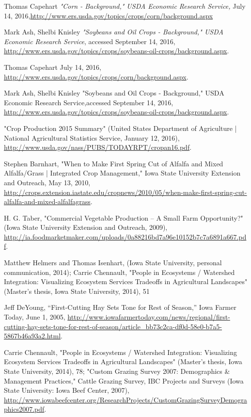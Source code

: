 \documentclass[11pt]{article}
\begin{document}
\cleardoublepage


\begin{thebibliography}{1}

   Thomas Capehart {\em "Corn - Background," USDA Economic Research Service, }July 14, 2016,\url{http://www.ers.usda.gov/topics/crops/corn/background.aspx}

    Mark Ash, Shelbi Knisley {\em "Soybeans and Oil Crops - Background," USDA Economic Research Service}, accessed September 14, 2016, \url{http://www.ers.usda.gov/topics/crops/soybeans-oil-crops/background.aspx}.

   Thomas Capehart July 14, 2016, \url{http://www.ers.usda.gov/topics/crops/corn/background.aspx}.

  Mark Ash, Shelbi Knisley  "Soybeans and Oil Crops - Background," USDA Economic Research Service,accessed September 14, 2016, \url{http://www.ers.usda.gov/topics/crops/soybeans-oil-crops/background.aspx}.
  
  "Crop Production 2015 Summary" (United States Department of Agriculture | National Agricultural Statistics Service, January 12, 2016), \url{http://www.usda.gov/nass/PUBS/TODAYRPT/cropan16.pdf}.
  
  Stephen Barnhart, "When to Make First Spring Cut of Alfalfa and Mixed Alfalfa/Grass | Integrated Crop Management," Iowa State University Extension and Outreach, May 13, 2010, \url{http://crops.extension.iastate.edu/cropnews/2010/05/when-make-first-spring-cut-alfalfa-and-mixed-alfalfagrass}.
  
  H. G. Taber, "Commercial Vegetable Production – A Small Farm Opportunity?" (Iowa State University Extension and Outreach, 2009), \url{http://ia.foodmarketmaker.com/uploads/0a88216bd7a96e10152b7c7a6891a667.pdf}.
  
  Matthew Helmers and Thomas Isenhart, (Iowa State University, personal communication, 2014); Carrie Chennault, "People in Ecosystems / Watershed Integration: Visualizing Ecosystem Services Tradeoffs in Agricultural Landscapes" (Master’s thesis, Iowa State University, 2014), 51
  
  Jeff DeYoung, “First-Cutting Hay Sets Tone for Rest of Season,” Iowa Farmer Today, June 1, 2005, \url{http://www.iowafarmertoday.com/news/regional/first-cutting-hay-sets-tone-for-rest-of-season/article_bb73c2ca-df0d-58e0-b7a5-5867b46a93a2.html}.
  
Carrie Chennault, "People in Ecosystems / Watershed Integration: Visualizing Ecosystem Services Tradeoffs in Agricultural Landscapes" (Master’s thesis, Iowa State University, 2014), 78; "Custom Grazing Survey 2007: Demographics \& Management Practices," Cattle Grazing Survey, IBC Projects and Surveys (Iowa State University: Iowa Beef Center, 2007), \url{http://www.iowabeefcenter.org/ResearchProjects/CustomGrazingSurveyDemographics2007.pdf}.
  

\end{thebibliography}
\end{document}
